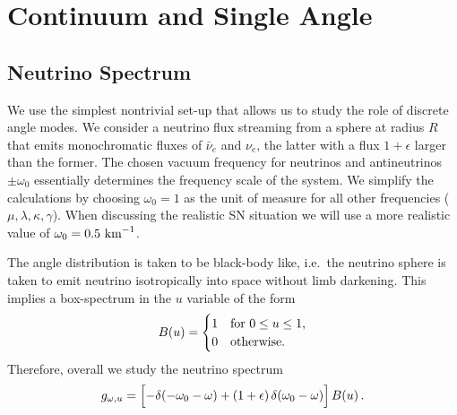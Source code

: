 \documentclass[twocolumn,prd,showpacs,
floatfix,preprintnumbers,nofootinbib]{revtex4}
\begin{document}


\section{Continuum and Single Angle}
\label{sec:single angle}

\subsection{Neutrino Spectrum}

We use the simplest nontrivial set-up that allows us to study the
role of discrete angle modes. We consider a neutrino flux streaming
from a sphere at radius $R$ that emits monochromatic fluxes of
$\bar\nu_e$ and $\nu_e$, the latter with a flux $1+\epsilon$ larger
than the former. 
The chosen vacuum frequency for neutrinos and antineutrinos $\pm\omega_0$ essentially determines the frequency scale of the system. We simplify the calculations by choosing $\omega_0=1$ as the unit of measure for all other frequencies ($\mu,\lambda,\kappa,\gamma$). When discussing the realistic SN situation we will use a more realistic value of $\omega_0 = 0.5~{\rm km}^{-1}$.

The angle distribution is taken to be black-body like, i.e.\ the
neutrino sphere is taken to emit neutrino isotropically into space
without limb darkening. This implies a box-spectrum in the $u$
variable of the form
\begin{equation}
B(u)=\begin{cases}1&\hbox{for $0\leq u\leq1$},\\
0&\hbox{otherwise.}\end{cases}
\end{equation}
Therefore, overall we study the neutrino spectrum
\begin{equation}
g_{\omega,u}=\Bigl[-\delta(-\omega_0-\omega)+
(1+\epsilon)\,\delta(\omega_0-\omega)\Bigr]\,B(u)\,.
\end{equation}
\end{document}
